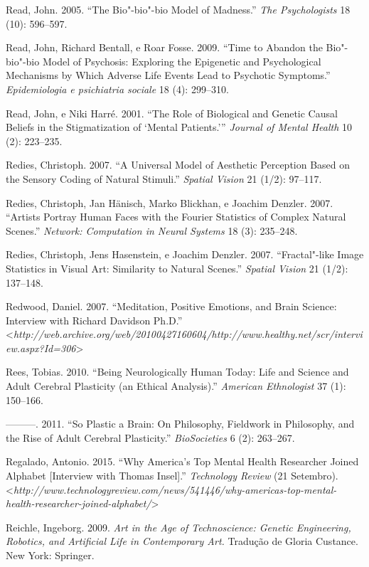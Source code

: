 Read, John. 2005. ``The Bio"-bio"-bio Model of Madness.'' \emph{The
Psychologists} 18 (10): 596--597.

Read, John, Richard Bentall, e Roar Fosse. 2009. ``Time to Abandon the
Bio"-bio"-bio Model of Psychosis: Exploring the Epigenetic and
Psychological Mechanisms by Which Adverse Life Events Lead to Psychotic
Symptoms.'' \emph{Epidemiologia e psichiatria sociale} 18 (4): 299--310.

Read, John, e Niki Harré. 2001. ``The Role of Biological and Genetic
Causal Beliefs in the Stigmatization of `Mental Patients.'''
\emph{Journal of Mental Health} 10 (2): 223--235.

Redies, Christoph. 2007. ``A Universal Model of Aesthetic Perception
Based on the Sensory Coding of Natural Stimuli.'' \emph{Spatial Vision}
21 (1/2): 97--117.

Redies, Christoph, Jan Hänisch, Marko Blickhan, e Joachim Denzler. 2007.
``Artists Portray Human Faces with the Fourier Statistics of Complex
Natural Scenes.'' \emph{Network: Computation in Neural Systems} 18 (3):
235--248.

Redies, Christoph, Jens Hasenstein, e Joachim Denzler. 2007.
``Fractal"-like Image Statistics in Visual Art: Similarity to Natural
Scenes.'' \emph{Spatial Vision} 21 (1/2): 137--148.

Redwood, Daniel. 2007. ``Meditation, Positive Emotions, and Brain
Science: Interview with Richard Davidson Ph.D.''
\textless{}\emph{http://web.archive.org/web/20100427160604/http://www.healthy.net/scr/interview.aspx?Id=306}\textgreater{}

Rees, Tobias. 2010. ``Being Neurologically Human Today: Life and Science
and Adult Cerebral Plasticity (an Ethical Analysis).'' \emph{American
Ethnologist} 37 (1): 150--166.

---------. 2011. ``So Plastic a Brain: On Philosophy, Fieldwork in
Philosophy, and the Rise of Adult Cerebral Plasticity.''
\emph{BioSocieties} 6 (2): 263--267.

Regalado, Antonio. 2015. ``Why America's Top Mental Health Researcher
Joined Alphabet {[}Interview with Thomas Insel{]}.'' \emph{
Technology Review} (21 Setembro).
\textless{}\emph{http://www.technologyreview.com/news/541446/why-americas-top-mental-health-researcher-joined-alphabet/}\textgreater{}

Reichle, Ingeborg. 2009. \emph{Art in the Age of Technoscience: Genetic
Engineering, Robotics, and Artificial Life in Contemporary Art.}
Tradução de Gloria Custance. New York: Springer.

